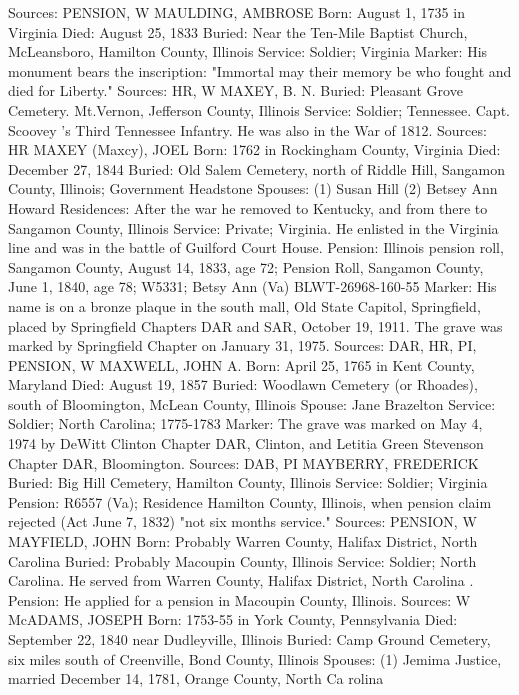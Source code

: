 Sources: PENSION, W 
MAULDING, AMBROSE 
Born: August 1, 1735 in Virginia
Died: August 25, 1833
Buried: Near the Ten-Mile Baptist Church, McLeansboro, Hamilton County, Illinois
Service: Soldier; Virginia
Marker: His monument bears the inscription: "Immortal may their memory be who fought and died for Liberty."
Sources: HR, W 
MAXEY, B. N. 
Buried: Pleasant Grove Cemetery. Mt.Vernon, Jefferson County, Illinois 
Service: Soldier; Tennessee. Capt. Scoovey 's Third Tennessee Infantry. He was also in the War of 1812. 
Sources: HR 
MAXEY (Maxcy), JOEL
Born: 1762 in Rockingham County, Virginia
Died: December 27, 1844
Buried: Old Salem Cemetery, north of Riddle Hill, Sangamon County, Illinois; Government Headstone
Spouses: (1) Susan Hill
	 (2) Betsey Ann Howard 
Residences: After the war he removed to Kentucky, and from there to Sangamon County, Illinois 
Service: Private; Virginia. He enlisted in the Virginia line and was in the battle of Guilford Court House. 
Pension: Illinois pension roll, Sangamon County, August 14, 1833, age 72; Pen­sion Roll, Sangamon County, June 1, 1840, age 78; W5331; Betsy Ann (Va) BLWT-26968-160-55 
Marker: His name is on a bronze plaque in the south mall, Old State Capitol, Springfield, placed by Springfield Chapters DAR and SAR, October 19, 1911. The grave was marked by Springfield Chapter on January 31, 1975. 
Sources: DAR, HR, PI, PENSION, W 
MAXWELL, JOHN A.
Born: April 25, 1765 in Kent County, Maryland
Died: August 19, 1857
Buried: Woodlawn Cemetery (or Rhoades), south of Bloomington, McLean County, Illinois
Spouse: Jane Brazelton 
Service: Soldier; North Carolina; 1775-1783
Marker: The grave was marked on May 4, 1974 by DeWitt Clinton Chapter DAR, Clinton, and Letitia Green Stevenson Chapter DAR, Bloomington.
Sources: DAB, PI 
MAYBERRY, FREDERICK 
Buried: Big Hill Cemetery, Hamilton County, Illinois
Service: Soldier; Virginia
Pension: R6557 (Va); Residence Hamilton County, Illinois, when pension claim rejected (Act June 7, 1832) "not six months service."
Sources: PENSION, W 
MAYFIELD, JOHN
Born: Probably Warren County, Halifax District, North Carolina
Buried: Probably Macoupin County, Illinois
Service: Soldier; North Carolina. He served from Warren County, Halifax Dis­trict, North Carolina . 
Pension: He applied for a pension in Macoupin County, Illinois.
Sources: W 
McADAMS, JOSEPH
Born: 1753-55 in York County, Pennsylvania
Died: September 22, 1840 near Dudleyville, Illinois 
Buried: Camp Ground Cemetery, six miles south of Creenville, Bond County, Illinois 
Spouses: (1) Jemima Justice, married December 14, 1781, Orange County, North Ca rolina

